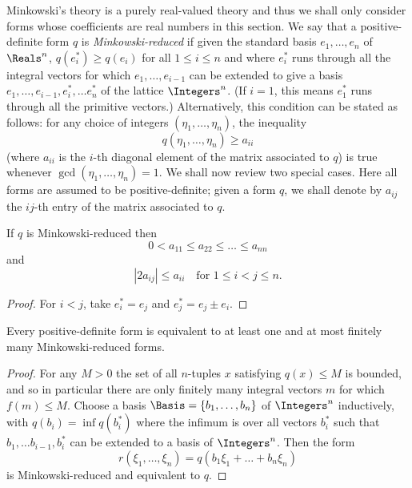 Minkowski's theory is a purely real-valued theory and thus we shall only consider forms whose coefficients are real numbers in this section. We say that a positive-definite form \(q\) is \emph{Minkowski-reduced} if given the standard basis \(e_1, \dots, e_n\) of \(\Reals^n\), \(q(e^*_i) \geq q(e_i)\) for all \(1 \leq i \leq n\) and where \(e^*_i\) runs through all the integral vectors for which \(e_1, \dots, e_{i-1}\) can be extended to give a basis \(e_1, \dots, e_{i-1}, e^*_i, \dots e^*_n\) of the lattice \(\Integers^n\). (If \(i = 1\), this means \(e^*_1\) runs through all the primitive vectors.) \cite[p.\,255]{cassels2008rational} Alternatively, this condition can be stated as follows: for any choice of integers \((\eta_1, \dots, \eta_n)\), the inequality
\[
    q(\eta_1, \dots, \eta_n) \geq a_{ii}
\]
(where \(a_{ii}\) is the \(i\)-th diagonal element of the matrix associated to \(q\)) is true whenever \(\gcd(\eta_1, \dots, \eta_n) = 1\). We shall now review two special cases. Here all forms are assumed to be positive-definite; given a form \(q\), we shall denote by \(a_{ij}\) the \(ij\)-th entry of the matrix associated to \(q\).

\begin{lemma}
    If \(q\) is Minkowski-reduced then
    \[
        0 < a_{11} \leq a_{22} \leq \dots \leq a_{nn}
    \]
    and 
    \[
        |2a_{ij}| \leq a_{ii} \quad \text{for } 1 \leq i < j \leq n.
    \]
\end{lemma}

\begin{proof}
    For \(i < j\), take \(e^*_i = e_j\) and \(e^*_j = e_j \pm e_i\).
\end{proof}

\begin{theoremx}
    Every positive-definite form is equivalent to at least one and at most finitely many Minkowski-reduced forms.
\end{theoremx}

\begin{proof}
    For any \(M > 0\) the set of all \(n\)-tuples \(x\) satisfying \(q(x) \leq M\) is bounded, and so in particular there are only finitely many integral vectors \(m\) for which \(f(m) \leq M\). Choose a basis \(\Basis = \{b_1, \dots, b_n\}\) of \(\Integers^n\) inductively, with \(q(b_i) = \inf q(b^*_i)\) where the infimum is over all vectors \(b^*_i\) such that \(b_1, \dots b_{i-1}, b^*_i\) can be extended to a basis of \(\Integers^n\). Then the form
    \[
        r(\xi_1, \dots, \xi_n) = q(b_1 \xi_1 + \dots + b_n \xi_n)
    \]
    is Minkowski-reduced and equivalent to \(q\).
\end{proof}

